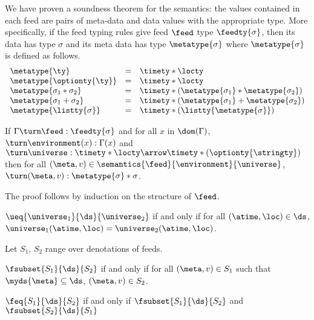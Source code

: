 We have proven a soundness theorem for the semantics: the values
contained in each feed are pairs of meta-data and data 
values with the appropriate type.  More specifically, if the feed typing
rules give feed $\feed$ type $\feedty{\sigma}$, 
then its data has type $\sigma$ and
its meta data has type $\metatype{\sigma}$ where $\metatype{\sigma}$ is
defined as follows.
\[
\begin {array} {lcl}
\metatype{\ty} & = & \timety * \locty \\
\metatype{\optionty{\ty}} & = & \timety * \locty \\
\metatype{\sigma_1 * \sigma_2} & = & \timety * (\metatype{\sigma_1} * \metatype{\sigma_2}) \\
\metatype{\sigma_1 + \sigma_2} & = & \timety * (\metatype{\sigma_1} + \metatype{\sigma_2}) \\
\metatype{\listty{\sigma}} & = & \timety * (\listty{\metatype{\sigma}}) \\
\end{array}
\]
\begin{theorem}
If $\Gamma \turn \feed : \feedty{\sigma}$ and
for all $x$ in $\dom(\Gamma)$, $\turn \environment(x) : \Gamma(x)$
and $\turn \universe : \timety * \locty \arrow \timety * (\optionty{\stringty})$
then
for all $(\meta,v) \in \semantics{\feed}{\environment}{\universe}$,
$\turn (\meta,v) : \metatype{\sigma} * \sigma$. 
\end{theorem}
The proof follows by induction on the structure of $\feed$.

\begin{definition}
$\ueq{\universe_1}{\ds}{\universe_2}$ if and only if for all
$(\atime,\loc) \in \ds$, $\universe_1(\atime,\loc) = \universe_2(\atime,\loc)$.
\end{definition}

Let $S_1$, $S_2$ range over denotations of feeds.

\begin{definition}
$\fsubset{S_1}{\ds}{S_2}$ if and only if for all
$(\meta,v) \in S_1$ such that
$\myds{\meta} \subseteq \ds$, $(\meta,v) \in S_2$.
\end{definition}

\begin{definition}
$\feq{S_1}{\ds}{S_2}$ if and only if 
$\fsubset{S_1}{\ds}{S_2}$ and
$\fsubset{S_2}{\ds}{S_1}$
\end{definition}


